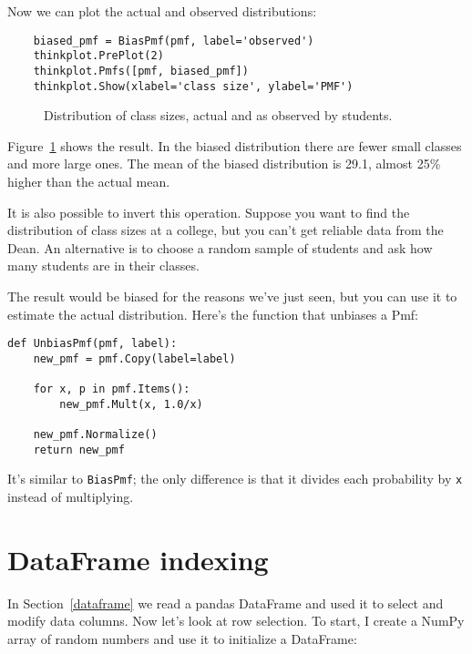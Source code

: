Now we can plot the actual and observed distributions:

\begin{verbatim}
    biased_pmf = BiasPmf(pmf, label='observed')
    thinkplot.PrePlot(2)
    thinkplot.Pmfs([pmf, biased_pmf])
    thinkplot.Show(xlabel='class size', ylabel='PMF')
\end{verbatim}

\begin{figure}
\caption{Distribution of class sizes, actual and as observed by students.}
\label{class_size1}
\end{figure}

Figure~\ref{class_size1} shows the result.  In the biased distribution
there are fewer small classes and more large ones.
The mean of the biased distribution is 29.1, almost 25\% higher
than the actual mean.

It is also possible to invert this operation.  Suppose you want to
find the distribution of class sizes at a college, but you can't get
reliable data from the Dean.  An alternative is to choose a random
sample of students and ask how many students are in their
classes.   

The result would be biased for the reasons we've just seen, but you
can use it to estimate the actual distribution.  Here's the function
that unbiases a Pmf:

\begin{verbatim}
def UnbiasPmf(pmf, label):
    new_pmf = pmf.Copy(label=label)

    for x, p in pmf.Items():
        new_pmf.Mult(x, 1.0/x)
        
    new_pmf.Normalize()
    return new_pmf
\end{verbatim}

It's similar to {\tt BiasPmf}; the only difference is that it
divides each probability by {\tt x} instead of multiplying.


\section{DataFrame indexing}

In Section~\ref{dataframe} we read a pandas DataFrame and used it to
select and modify data columns.  Now let's look at row selection.
To start, I create a NumPy array of random numbers and use it
to initialize a DataFrame:

